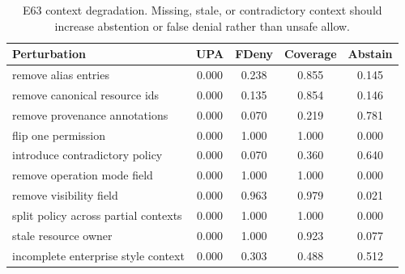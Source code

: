 \begin{table}[t]
\centering
\small
\caption{E63 context degradation. Missing, stale, or contradictory context should increase abstention or false denial rather than unsafe allow.}
\label{tab:e63-degradation}
\begin{tabular}{lcccc}
\toprule
Perturbation & UPA & FDeny & Coverage & Abstain \\
\midrule
remove alias entries & 0.000 & 0.238 & 0.855 & 0.145 \\
remove canonical resource ids & 0.000 & 0.135 & 0.854 & 0.146 \\
remove provenance annotations & 0.000 & 0.070 & 0.219 & 0.781 \\
flip one permission & 0.000 & 1.000 & 1.000 & 0.000 \\
introduce contradictory policy & 0.000 & 0.070 & 0.360 & 0.640 \\
remove operation mode field & 0.000 & 1.000 & 1.000 & 0.000 \\
remove visibility field & 0.000 & 0.963 & 0.979 & 0.021 \\
split policy across partial contexts & 0.000 & 1.000 & 1.000 & 0.000 \\
stale resource owner & 0.000 & 1.000 & 0.923 & 0.077 \\
incomplete enterprise style context & 0.000 & 0.303 & 0.488 & 0.512 \\
\bottomrule
\end{tabular}
\end{table}

